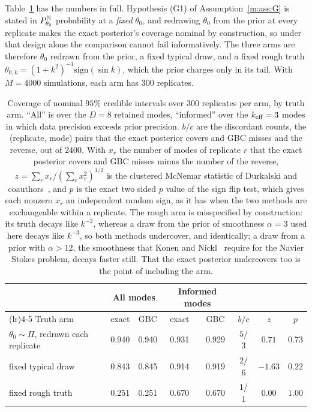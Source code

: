 Table~\ref{m:tab:cover} has the numbers in full. Hypothesis (G1) of Assumption~\ref{m:ass:G} is stated in $P^{\mathbb{N}}_{\theta_0}$ probability at a \emph{fixed} $\theta_0$, and redrawing $\theta_0$ from the prior at every replicate makes the exact posterior's coverage nominal by construction, so under that design alone the comparison cannot fail informatively. The three arms are therefore $\theta_0$ redrawn from the prior, a fixed typical draw, and a fixed rough truth $\theta_{0,k}=(1+k^2)^{-1}\mathrm{sign}(\sin k)$, which the prior charges only in its tail. With $M=4000$ simulations, each arm has 300 replicates.

\begin{table}[t]\centering\footnotesize\setlength{\tabcolsep}{4pt}
\caption{Coverage of nominal $95\%$ credible intervals over 300 replicates per arm, by truth arm. ``All'' is over the $D=8$ retained modes, ``informed'' over the $k_{\rm eff}=3$ modes in which data precision exceeds prior precision. $b/c$ are the discordant counts, the (replicate, mode) pairs that the exact posterior covers and GBC misses and the reverse, out of $2400$. With $x_r$ the number of modes of replicate $r$ that the exact posterior covers and GBC misses minus the number of the reverse, $z=\sum_rx_r/(\sum_rx_r^2)^{1/2}$ is the clustered McNemar statistic of Durkalski and coauthors~\cite{durkalski2003}, and $p$ is the exact two sided $p$ value of the sign flip test, which gives each nonzero $x_r$ an independent random sign, as it has when the two methods are exchangeable within a replicate. The rough arm is misspecified by construction: its truth decays like $k^{-2}$, whereas a draw from the prior of smoothness $\alpha=3$ used here decays like $k^{-3}$, so both methods undercover, and identically; a draw from a prior with $\alpha>12$, the smoothness that Konen and Nickl~\cite{konennickl2026} require for the Navier Stokes problem, decays faster still. That the exact posterior undercovers too is the point of including the arm.}\label{m:tab:cover}
\begin{tabular}{>{\raggedright\arraybackslash}p{1.5in}ccccccc}
\toprule
& \multicolumn{2}{c}{All modes} & \multicolumn{2}{c}{Informed modes} & & & \\
\cmidrule(lr){2-3}\cmidrule(lr){4-5}
Truth arm & exact & GBC & exact & GBC & $b/c$ & $z$ & $p$\\
\midrule
$\theta_0\sim\Pi$, redrawn each replicate & 0.940 & 0.940 & 0.931 & 0.929 & $5$/$3$ & $0.71$ & $0.73$\\
fixed typical draw & 0.843 & 0.845 & 0.914 & 0.919 & $2$/$6$ & $-1.63$ & $0.22$\\
fixed rough truth & 0.251 & 0.251 & 0.670 & 0.670 & $1$/$1$ & $0.00$ & $1.00$\\
\bottomrule
\end{tabular}
\end{table}

